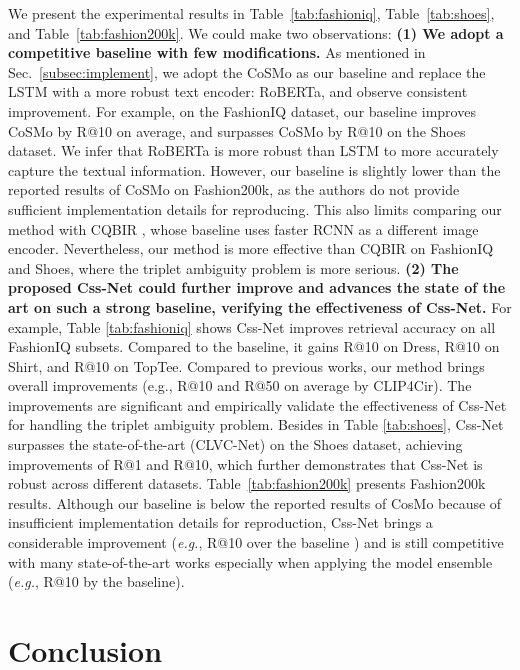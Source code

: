 \documentclass[sigconf]{acmart}
\def\eg{\emph{e.g.}}
\begin{document}
We present the experimental results in Table~\ref{tab:fashioniq}, Table~\ref{tab:shoes}, and Table~\ref{tab:fashion200k}. 
We could make two observations: \textbf{(1) We adopt a competitive baseline with few modifications.} As mentioned in Sec.~\ref{subsec:implement}, we adopt the CoSMo as our baseline and replace the LSTM with a more robust text encoder: RoBERTa, and observe consistent improvement. For example, on the FashionIQ dataset, our baseline improves CoSMo by  R@10 on average, and surpasses CoSMo by  R@10 on the Shoes dataset. We infer that RoBERTa is more robust than LSTM \cite{hochreiter1997long} to more accurately capture the textual information. However, our baseline is slightly lower than the reported results of CoSMo on Fashion200k, as the authors do not provide sufficient implementation details for reproducing. This also limits comparing our method with CQBIR \cite{zhang2022comprehensive}, whose baseline uses faster RCNN \cite{girshick2015fast} as a different image encoder. Nevertheless, our method is more effective than CQBIR on FashionIQ and Shoes, where the triplet ambiguity problem is more serious.
\textbf{(2) The proposed Css-Net could further improve and advances the state of the art on such a strong baseline, verifying the effectiveness of Css-Net.} For example, Table \ref{tab:fashioniq} shows Css-Net improves retrieval accuracy on all FashionIQ subsets. Compared to the baseline, it gains  R@10 on Dress,  R@10 on Shirt, and  R@10 on TopTee. Compared to previous works, our method brings overall improvements (e.g.,  R@10 and  R@50 on average by CLIP4Cir). The improvements are significant and empirically validate the effectiveness of Css-Net for handling the triplet ambiguity problem. Besides in Table \ref{tab:shoes}, Css-Net surpasses the state-of-the-art (CLVC-Net) on the Shoes dataset, achieving improvements of  R@1 and  R@10, which further demonstrates that Css-Net is robust across different datasets. Table~\ref{tab:fashion200k} presents Fashion200k results. Although our baseline is below the reported results of CosMo because of insufficient implementation details for reproduction, Css-Net brings a considerable improvement (\eg,  R@10 over the baseline ) and is still competitive with many state-of-the-art works especially when applying the model ensemble (\eg,  R@10 by the baseline).


\section{Conclusion} \label{conclusion}
\end{document}
